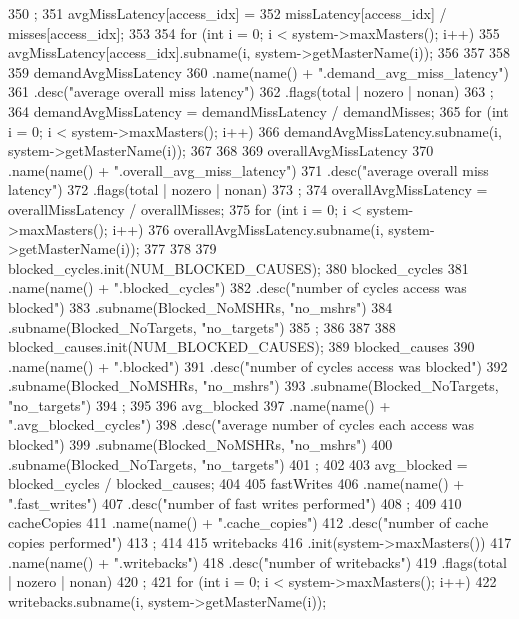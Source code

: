 \begin{DoxyCode}
{{350             ;
351         avgMissLatency[access_idx] =
352             missLatency[access_idx] / misses[access_idx];
353 
354         for (int i = 0; i < system->maxMasters(); i++) {
355             avgMissLatency[access_idx].subname(i, system->getMasterName(i));
356         }
357     }
358 
359     demandAvgMissLatency
360         .name(name() + ".demand_avg_miss_latency")
361         .desc("average overall miss latency")
362         .flags(total | nozero | nonan)
363         ;
364     demandAvgMissLatency = demandMissLatency / demandMisses;
365     for (int i = 0; i < system->maxMasters(); i++) {
366         demandAvgMissLatency.subname(i, system->getMasterName(i));
367     }
368 
369     overallAvgMissLatency
370         .name(name() + ".overall_avg_miss_latency")
371         .desc("average overall miss latency")
372         .flags(total | nozero | nonan)
373         ;
374     overallAvgMissLatency = overallMissLatency / overallMisses;
375     for (int i = 0; i < system->maxMasters(); i++) {
376         overallAvgMissLatency.subname(i, system->getMasterName(i));
377     }
378 
379     blocked_cycles.init(NUM_BLOCKED_CAUSES);
380     blocked_cycles
381         .name(name() + ".blocked_cycles")
382         .desc("number of cycles access was blocked")
383         .subname(Blocked_NoMSHRs, "no_mshrs")
384         .subname(Blocked_NoTargets, "no_targets")
385         ;
386 
387 
388     blocked_causes.init(NUM_BLOCKED_CAUSES);
389     blocked_causes
390         .name(name() + ".blocked")
391         .desc("number of cycles access was blocked")
392         .subname(Blocked_NoMSHRs, "no_mshrs")
393         .subname(Blocked_NoTargets, "no_targets")
394         ;
395 
396     avg_blocked
397         .name(name() + ".avg_blocked_cycles")
398         .desc("average number of cycles each access was blocked")
399         .subname(Blocked_NoMSHRs, "no_mshrs")
400         .subname(Blocked_NoTargets, "no_targets")
401         ;
402 
403     avg_blocked = blocked_cycles / blocked_causes;
404 
405     fastWrites
406         .name(name() + ".fast_writes")
407         .desc("number of fast writes performed")
408         ;
409 
410     cacheCopies
411         .name(name() + ".cache_copies")
412         .desc("number of cache copies performed")
413         ;
414 
415     writebacks
416         .init(system->maxMasters())
417         .name(name() + ".writebacks")
418         .desc("number of writebacks")
419         .flags(total | nozero | nonan)
420         ;
421     for (int i = 0; i < system->maxMasters(); i++) {
422         writebacks.subname(i, system->getMasterName(i));
}}
\end{DoxyCode}
